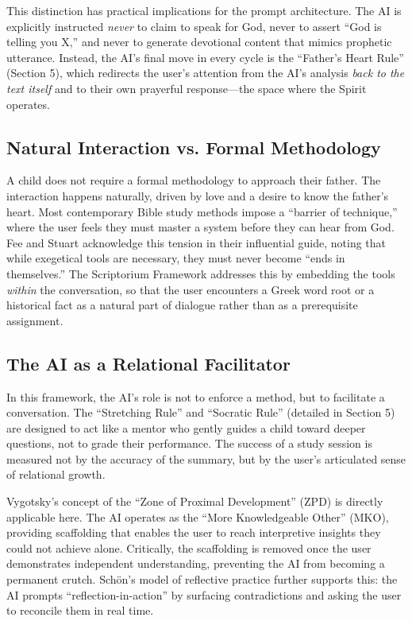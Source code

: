 This distinction has practical implications for the prompt architecture. The AI is explicitly instructed \textit{never} to claim to speak for God, never to assert ``God is telling you X,'' and never to generate devotional content that mimics prophetic utterance. Instead, the AI's final move in every cycle is the ``Father's Heart Rule'' (Section 5), which redirects the user's attention from the AI's analysis \textit{back to the text itself} and to their own prayerful response---the space where the Spirit operates.

\subsection{Natural Interaction vs. Formal Methodology}
A child does not require a formal methodology to approach their father. The interaction happens naturally, driven by love and a desire to know the father's heart. Most contemporary Bible study methods impose a ``barrier of technique,'' where the user feels they must master a system before they can hear from God. Fee and Stuart \cite{fee2003} acknowledge this tension in their influential guide, noting that while exegetical tools are necessary, they must never become ``ends in themselves.'' The Scriptorium Framework addresses this by embedding the tools \textit{within} the conversation, so that the user encounters a Greek word root or a historical fact as a natural part of dialogue rather than as a prerequisite assignment.

\subsection{The AI as a Relational Facilitator}
In this framework, the AI's role is not to enforce a method, but to facilitate a conversation. The ``Stretching Rule'' and ``Socratic Rule'' (detailed in Section 5) are designed to act like a mentor who gently guides a child toward deeper questions, not to grade their performance. The success of a study session is measured not by the accuracy of the summary, but by the user's articulated sense of relational growth.

Vygotsky's \cite{vygotsky1978} concept of the ``Zone of Proximal Development'' (ZPD) is directly applicable here. The AI operates as the ``More Knowledgeable Other'' (MKO), providing scaffolding that enables the user to reach interpretive insights they could not achieve alone. Critically, the scaffolding is removed once the user demonstrates independent understanding, preventing the AI from becoming a permanent crutch. Sch\"{o}n's \cite{schon1983} model of reflective practice further supports this: the AI prompts ``reflection-in-action'' by surfacing contradictions and asking the user to reconcile them in real time.
